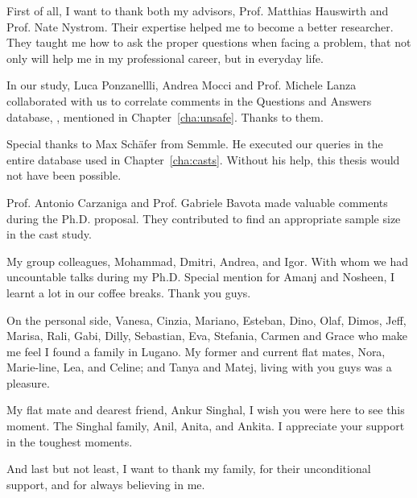 \begin{acknowledgements}
First of all, I want to thank both my advisors,
Prof. Matthias Hauswirth and Prof. Nate Nystrom.
Their expertise helped me to become a better researcher.
They taught me how to ask the proper questions when facing a problem,
that not only will help me in my professional career,
but in everyday life.

In our \unsafe{} study,
Luca Ponzanellli, Andrea Mocci and Prof. Michele Lanza
collaborated with us to correlate \unsafe{} 
comments in the Questions and Answers database, \stackoverflow{}, mentioned in Chapter~\ref{cha:unsafe}.
Thanks to them.

Special thanks to Max Sch\"afer from Semmle.
He executed our \ql{} queries in the entire \lgtm{} database used in Chapter~\ref{cha:casts}.
Without his help, this thesis would not have been possible.

Prof. Antonio Carzaniga and Prof. Gabriele Bavota made valuable comments during the Ph.D. proposal.
They contributed to find an appropriate sample size in the cast study.

My group colleagues, Mohammad, Dmitri, Andrea, and Igor.
With whom we had uncountable talks during my Ph.D.
Special mention for Amanj and Nosheen,
I learnt a lot in our coffee breaks.
Thank you guys.

On the personal side,
Vanesa, Cinzia, Mariano, Esteban, Dino, Olaf, Dimos, Jeff, Marisa, Rali, Gabi, Dilly, Sebastian, Eva, Stefania, Carmen and Grace 
who make me feel I found a family in Lugano.
My former and current flat mates, Nora, Marie-line, Lea, and Celine;
and Tanya and Matej, living with you guys was a pleasure.

My flat mate and dearest friend, Ankur Singhal,
I wish you were here to see this moment.
The Singhal family, Anil, Anita, and Ankita.
I appreciate your support in the toughest moments.

And last but not least,
I want to thank my family, for their unconditional support,
and for always believing in me.

\end{acknowledgements}
